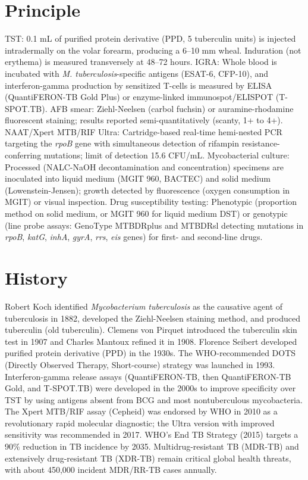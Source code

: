 \section*{Principle}
TST: 0.1 mL of purified protein derivative (PPD, 5 tuberculin units) is injected intradermally on the volar forearm, producing a 6--10 mm wheal. Induration (not erythema) is measured transversely at 48--72 hours. IGRA: Whole blood is incubated with \textit{M. tuberculosis}-specific antigens (ESAT-6, CFP-10), and interferon-gamma production by sensitized T-cells is measured by ELISA (QuantiFERON-TB Gold Plus) or enzyme-linked immunospot/ELISPOT (T-SPOT.TB). AFB smear: Ziehl-Neelsen (carbol fuchsin) or auramine-rhodamine fluorescent staining; results reported semi-quantitatively (scanty, 1+ to 4+). NAAT/Xpert MTB/RIF Ultra: Cartridge-based real-time hemi-nested PCR targeting the \textit{rpoB} gene with simultaneous detection of rifampin resistance-conferring mutations; limit of detection 15.6 CFU/mL. Mycobacterial culture: Processed (NALC-NaOH decontamination and concentration) specimens are inoculated into liquid medium (MGIT 960, BACTEC) and solid medium (Lowenstein-Jensen); growth detected by fluorescence (oxygen consumption in MGIT) or visual inspection. Drug susceptibility testing: Phenotypic (proportion method on solid medium, or MGIT 960 for liquid medium DST) or genotypic (line probe assays: GenoType MTBDRplus and MTBDRsl detecting mutations in \textit{rpoB}, \textit{katG}, \textit{inhA}, \textit{gyrA}, \textit{rrs}, \textit{eis} genes) for first- and second-line drugs.

\section*{History}
Robert Koch identified \textit{Mycobacterium tuberculosis} as the causative agent of tuberculosis in 1882, developed the Ziehl-Neelsen staining method, and produced tuberculin (old tuberculin). Clemens von Pirquet introduced the tuberculin skin test in 1907 and Charles Mantoux refined it in 1908. Florence Seibert developed purified protein derivative (PPD) in the 1930s. The WHO-recommended DOTS (Directly Observed Therapy, Short-course) strategy was launched in 1993. Interferon-gamma release assays (QuantiFERON-TB, then QuantiFERON-TB Gold, and T-SPOT.TB) were developed in the 2000s to improve specificity over TST by using antigens absent from BCG and most nontuberculous mycobacteria. The Xpert MTB/RIF assay (Cepheid) was endorsed by WHO in 2010 as a revolutionary rapid molecular diagnostic; the Ultra version with improved sensitivity was recommended in 2017. WHO's End TB Strategy (2015) targets a 90\% reduction in TB incidence by 2035. Multidrug-resistant TB (MDR-TB) and extensively drug-resistant TB (XDR-TB) remain critical global health threats, with about 450,000 incident MDR/RR-TB cases annually.

